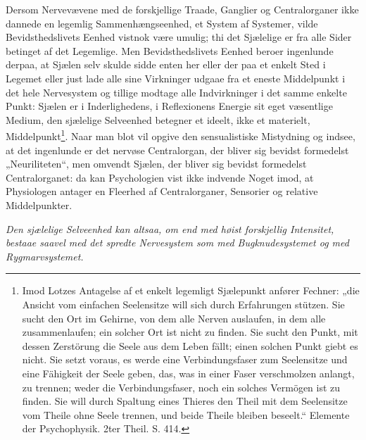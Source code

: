 \documentclass[12pt,a4paper]{book}
\begin{document}
Dersom Nervevævene med de forskjellige Traade, Ganglier og Centralorganer ikke
dannede en legemlig Sammenhængseenhed, et System af Systemer, vilde
Bevidsthedslivets Eenhed vistnok være umulig; thi det Sjælelige er fra alle
Sider betinget af det Legemlige. Men Bevidsthedslivets Eenhed beroer ingenlunde
derpaa, at Sjælen selv skulde sidde enten her eller der paa et enkelt Sted i
Legemet eller just lade alle sine Virkninger udgaae fra et eneste Middelpunkt i
det hele Nervesystem og tillige modtage alle Indvirkninger i det samme enkelte
Punkt: Sjælen er i Inderlighedens, i Reflexionens Energie sit eget væsentlige
Medium, den sjælelige Selveenhed betegner et ideelt, ikke et materielt,
Middelpunkt\footnote{Imod Lotzes Antagelse af et enkelt legemligt Sjælepunkt
anfører Fechner: „die Ansicht vom einfachen Seelensitze will sich durch
Erfahrungen stützen. Sie sucht den Ort im Gehirne, von dem alle Nerven
auslaufen, in dem alle zusammenlaufen; ein solcher Ort ist nicht zu finden. Sie
sucht den Punkt, mit dessen Zerstörung die Seele aus dem Leben fällt; einen
solchen Punkt giebt es nicht. Sie setzt voraus, es werde eine Verbindungsfaser
zum Seelensitze und eine Fähigkeit der Seele geben, das, was in einer Faser
verschmolzen anlangt, zu trennen; weder die Verbindungsfaser, noch ein solches
Vermögen ist zu finden. Sie will durch Spaltung eines Thieres den Theil mit dem
Seelensitze vom Theile ohne Seele trennen, und beide Theile bleiben beseelt.“
Elemente der Psychophysik. 2ter Theil. S. 414.}.
\setcounter{footnote}{0}
Naar man blot vil opgive den sensualistiske Mistydning og indsee, at det
ingenlunde er det nervøse Centralorgan, der bliver sig bevidst formedelst
„Neuriliteten“, men omvendt Sjælen, der bliver sig bevidst formedelst
Centralorganet: da kan Psychologien vist ikke indvende Noget imod, at
Physiologen antager en Fleerhed af Centralorganer, Sensorier og relative
Middelpunkter.

\emph{Den sjælelige Selveenhed kan altsaa, om end med høist forskjellig
Intensitet, bestaae saavel med det spredte Nervesystem som med Bugknudesystemet
og med Rygmarvsystemet.}
\end{document}
